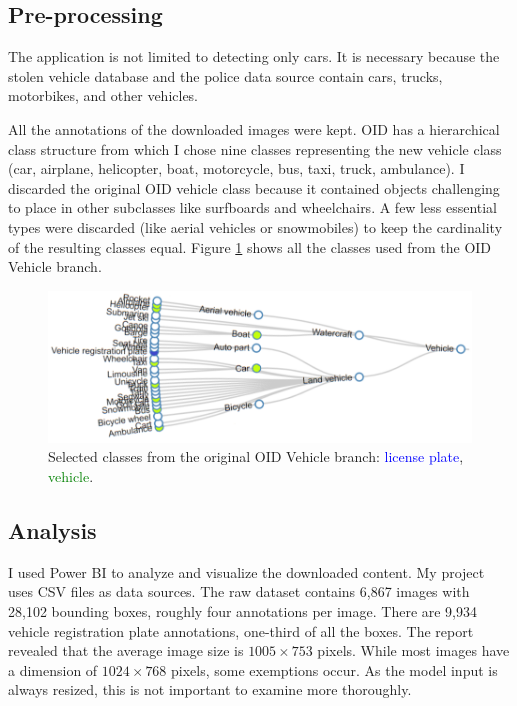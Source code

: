 \subsection{Pre-processing}

The application is not limited to detecting only cars. It is necessary because the stolen vehicle database and the police data source contain cars, trucks, motorbikes, and other vehicles.

All the annotations of the downloaded images were kept. OID has a hierarchical class structure from which I chose nine classes representing the new vehicle class (car, airplane, helicopter, boat, motorcycle, bus, taxi, truck, ambulance). I discarded the original OID vehicle class because it contained objects challenging to place in other subclasses like surfboards and wheelchairs. A few less essential types were discarded (like aerial vehicles or snowmobiles) to keep the cardinality of the resulting classes equal. Figure \ref{fig:OID_classes} shows all the classes used from the OID Vehicle branch.

\begin{figure}[htb]
 \centerline{\includegraphics[width=1.0\columnwidth]{.//Figure/PlateLocalization/OID_classes.png}}
 \caption{Selected classes from the original OID Vehicle branch: \textcolor{blue}{license plate}, \textcolor{green}{vehicle}.}
 \label{fig:OID_classes}
\end{figure}

\subsection{Analysis}

I used Power BI to analyze and visualize the downloaded content. My project uses CSV files as data sources. The raw dataset contains 6,867 images with 28,102 bounding boxes, roughly four annotations per image. There are 9,934 vehicle registration plate annotations, one-third of all the boxes. The report revealed that the average image size is $1005\times753$ pixels. While most images have a dimension of $1024\times768$ pixels, some exemptions occur. As the model input is always resized, this is not important to examine more thoroughly.

